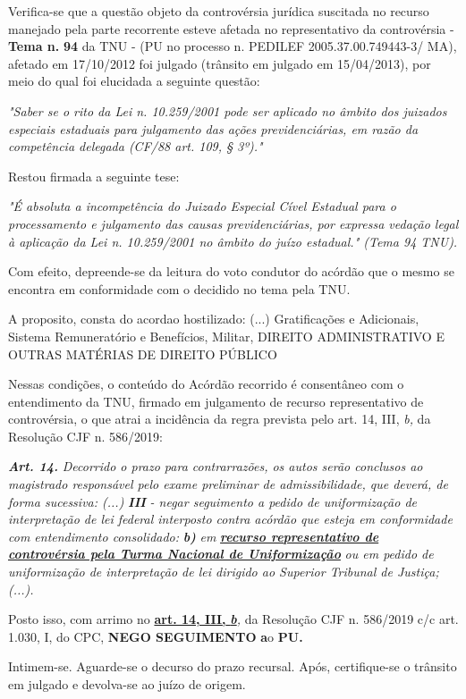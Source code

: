 \documentclass[12pt]{article}
\begin{document}
\justifying
\noindent Verifica-se que a questão objeto da controvérsia jurídica suscitada no recurso manejado pela parte recorrente esteve afetada no representativo da controvérsia - \textbf{Tema n. }\textbf{94} da TNU - (PU no processo n. PEDILEF 2005.37.00.749443-3/ MA),  afetado em 17/10/2012 foi julgado (trânsito em julgado em 15/04/2013), por meio do qual foi elucidada a seguinte questão:

\noindent \textit{"Saber se o rito da Lei n. 10.259/2001 pode ser aplicado no âmbito dos juizados especiais estaduais para julgamento das ações previdenciárias, em razão da competência delegada (CF/88 art. 109, § 3º)."}

\noindent Restou firmada a seguinte tese:

\noindent \textit{"É absoluta a incompetência do Juizado Especial Cível Estadual para o processamento e julgamento das causas previdenciárias, por expressa vedação legal à aplicação da Lei n. 10.259/2001 no âmbito do juízo estadual." (Tema 94 TNU).}

\noindent Com efeito, depreende-se da leitura do voto condutor do acórdão que o mesmo se encontra em conformidade com o decidido no  tema pela TNU.

\noindent A proposito, consta do acordao hostilizado: (...) Gratificações e Adicionais, Sistema Remuneratório e Benefícios, Militar, DIREITO ADMINISTRATIVO E OUTRAS MATÉRIAS DE DIREITO PÚBLICO

\noindent Nessas condições, o conteúdo do Acórdão recorrido é consentâneo com o entendimento da TNU, firmado em julgamento de recurso representativo de controvérsia, o que atrai a incidência da regra prevista pelo art. 14, III, \textit{b,} da Resolução CJF n. 586/2019:

\noindent \textit{\textbf{Art. 14.}}\textit{ Decorrido o prazo para contrarrazões, os autos serão conclusos ao magistrado responsável pelo exame preliminar de admissibilidade, que deverá, de forma sucessiva: (...) }\textit{\textbf{III }}\textit{- negar seguimento a pedido de uniformização de interpretação de lei federal interposto contra acórdão que esteja em conformidade com entendimento consolidado: }\textit{\textbf{b)}}\textit{ em }\uline{\textit{\textbf{recurso representativo de controvérsia pela Turma Nacional de Uniformização}}}\textit{ ou em pedido de uniformização de interpretação de lei dirigido ao Superior Tribunal de Justiça;(...).}

\noindent Posto isso, com arrimo no \uline{\textbf{art. 14, III, }}\uline{\textit{\textbf{b}}}\textit{,} da Resolução CJF n. 586/2019 c/c art. 1.030, I, do CPC, \textbf{NEGO SEGUIMENTO }\textbf{a}o\textbf{ PU}\textbf{.}

\noindent Intimem-se. Aguarde-se o decurso do prazo recursal. Após, certifique-se o trânsito em julgado e devolva-se ao juízo de origem.
\end{document}
